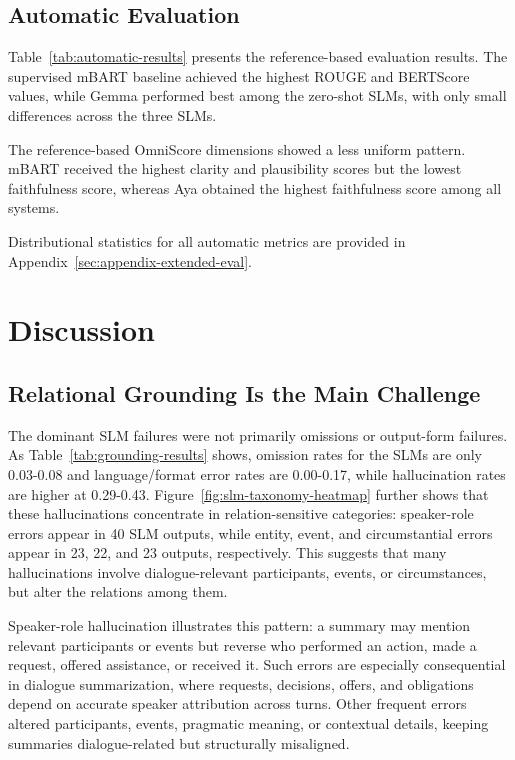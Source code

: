 \documentclass[11pt]{article}
\begin{document}
\subsection{Automatic Evaluation}

Table~\ref{tab:automatic-results} presents the reference-based evaluation results. The supervised mBART baseline achieved the highest ROUGE and BERTScore values, while Gemma performed best among the zero-shot SLMs, with only small differences across the three SLMs.

The reference-based OmniScore dimensions showed a less uniform pattern. mBART received the highest clarity and plausibility scores but the lowest faithfulness score, whereas Aya obtained the highest faithfulness score among all systems.

Distributional statistics for all automatic metrics are provided in Appendix~\ref{sec:appendix-extended-eval}.

\section{Discussion}

\subsection{Relational Grounding Is the Main Challenge}

The dominant SLM failures were not primarily omissions or output-form failures. As Table~\ref{tab:grounding-results} shows, omission rates for the SLMs are only 0.03-0.08 and language/format error rates are 0.00-0.17, while hallucination rates are higher at 0.29-0.43. Figure~\ref{fig:slm-taxonomy-heatmap} further shows that these hallucinations concentrate in relation-sensitive categories: speaker-role errors appear in 40 SLM outputs, while entity, event, and circumstantial errors appear in 23, 22, and 23 outputs, respectively. This suggests that many hallucinations involve dialogue-relevant participants, events, or circumstances, but alter the relations among them.

Speaker-role hallucination illustrates this pattern: a summary may mention relevant participants or events but reverse who performed an action, made a request, offered assistance, or received it. Such errors are especially consequential in dialogue summarization, where requests, decisions, offers, and obligations depend on accurate speaker attribution across turns. Other frequent errors altered participants, events, pragmatic meaning, or contextual details, keeping summaries dialogue-related but structurally misaligned.
\end{document}
